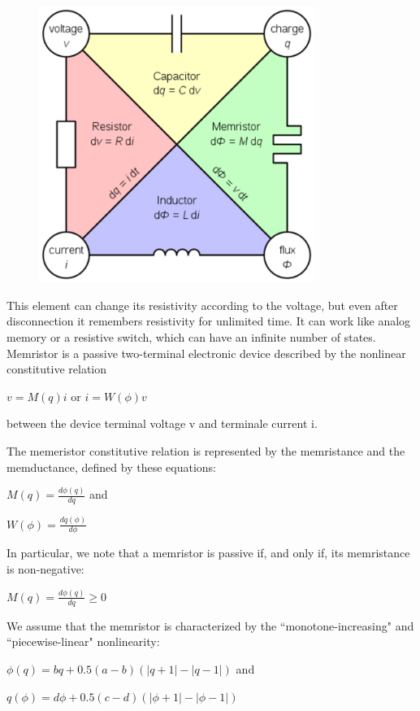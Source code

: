 \documentclass[12pt, a4paper]{paper}
\begin{document}
\begin{figure}[h]
\centering
\includegraphics[width=0.8\textwidth]{componenti_fondamentali_1.eps}
\end{figure}

This element can change its resistivity according to the voltage, but even after disconnection it remembers resistivity for unlimited time. It can work like analog memory or a resistive switch, which can have an infinite number of states.
Memristor is a passive two-terminal electronic device described by the nonlinear
constitutive relation

                     $v=M(q)i$ or $i=W(\phi)v$

 between the device terminal voltage v and 
terminale current i.

The memeristor constitutive relation is represented by the memristance and the
memductance, defined by these equations: 

$M(q) = \frac{d\phi(q)}{dq} $ and

$ W(\phi)=\frac{dq(\phi)}{d\phi}$

In particular, we note that a memristor is passive if, and only if, its 
memristance is non-negative:

$M(q)=\frac{d\phi(q)}{dq}\geq 0$

We assume that the memristor is characterized by the “monotone-increasing" and
“piecewise-linear" nonlinearity: 

$\phi(q)=bq+0.5(a-b)(|q+1|-|q-1|)$ and 

$q(\phi)=d\phi+0.5(c-d)(|\phi+1|-|\phi-1|)$
\end{document}
